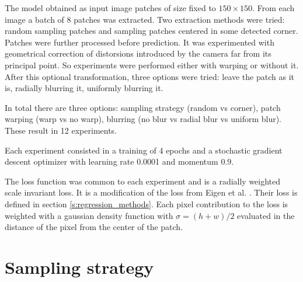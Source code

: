 The model obtained as input image patches of size fixed to $150 \times 150$.
From each image a batch of 8 patches was extracted.
Two extraction methods were tried: random sampling patches and sampling patches centered in some detected corner.
Patches were further processed before prediction.
It was experimented with geometrical correction of distorsions introduced by the camera far from its principal point.
So experiments were performed either with warping or without it.
After this optional transformation, three options were tried: leave the patch as it is, radially blurring it, uniformly blurring it.

In total there are three options: sampling strategy (random vs corner), patch warping (warp vs no warp), blurring (no blur vs radial blur vs uniform blur).
These result in 12 experiments.

Each experiment consisted in a training of 4 epochs and a stochastic gradient descent optimizer with learning rate 0.0001 and momentum 0.9.

The loss function was common to each experiment and is a radially weighted scale invariant loss.
It is a modification of the loss from Eigen et al. \cite{Eigen}.
Their loss is defined in section \ref{s:regression_methods}.
Each pixel contribution to the loss is weighted with a gaussian density function with $\sigma = (h + w) / 2$ evaluated in the distance of the pixel from the center of the patch.




\section{Sampling strategy}
\label{sec:sampling strategy}

